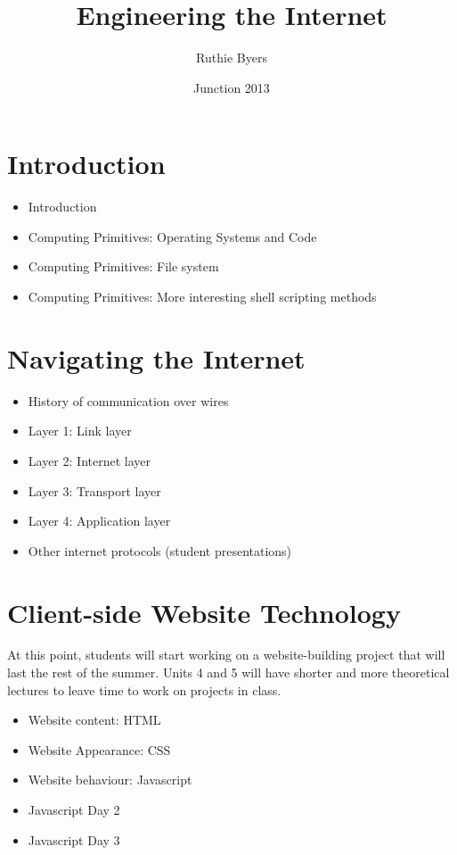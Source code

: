 \documentclass{article}
\title{Engineering the Internet}
\author{Ruthie Byers}
\date{Junction 2013}
\begin{document}
\maketitle

\section{Introduction}
\begin{itemize}
\item Introduction
\item Computing Primitives:  Operating Systems and Code
\item Computing Primitives:  File system
\item Computing Primitives:  More interesting shell scripting methods
\end{itemize}

\section{Navigating the Internet}
\begin{itemize}
\item History of communication over wires
\item Layer 1:  Link layer
\item Layer 2:  Internet layer
\item Layer 3:  Transport layer
\item Layer 4:  Application layer
\item Other internet protocols (student presentations)
\end{itemize}

\section{Client-side Website Technology}
At this point, students will start working on a website-building project that will last the rest of the summer.  Units 4 and 5 will have shorter and more theoretical lectures to leave time to work on projects in class.
\begin{itemize}
\item Website content:  HTML
\item Website Appearance:  CSS %
\item Website behaviour:  Javascript
\item Javascript Day 2
\item Javascript Day 3

\end{itemize}
\end{document}
